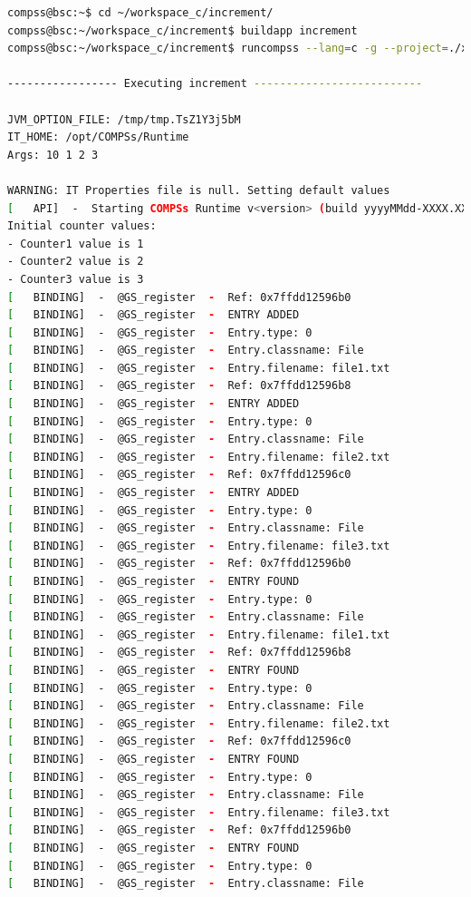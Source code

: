 \begin{lstlisting}[language=bash]
compss@bsc:~$ cd ~/workspace_c/increment/
compss@bsc:~/workspace_c/increment$ buildapp increment
compss@bsc:~/workspace_c/increment$ runcompss --lang=c -g --project=./xml/project.xml --resources=./xml/resources.xml ~/workspace_c/increment/master/increment 10 1 2 3

----------------- Executing increment --------------------------

JVM_OPTION_FILE: /tmp/tmp.TsZ1Y3j5bM 
IT_HOME: /opt/COMPSs/Runtime 
Args: 10 1 2 3 

WARNING: IT Properties file is null. Setting default values
[   API]  -  Starting COMPSs Runtime v<version> (build yyyyMMdd-XXXX.XXXX)
Initial counter values: 
- Counter1 value is 1
- Counter2 value is 2
- Counter3 value is 3
[   BINDING]  -  @GS_register  -  Ref: 0x7ffdd12596b0
[   BINDING]  -  @GS_register  -  ENTRY ADDED
[   BINDING]  -  @GS_register  -  Entry.type: 0
[   BINDING]  -  @GS_register  -  Entry.classname: File
[   BINDING]  -  @GS_register  -  Entry.filename: file1.txt
[   BINDING]  -  @GS_register  -  Ref: 0x7ffdd12596b8
[   BINDING]  -  @GS_register  -  ENTRY ADDED
[   BINDING]  -  @GS_register  -  Entry.type: 0
[   BINDING]  -  @GS_register  -  Entry.classname: File
[   BINDING]  -  @GS_register  -  Entry.filename: file2.txt
[   BINDING]  -  @GS_register  -  Ref: 0x7ffdd12596c0
[   BINDING]  -  @GS_register  -  ENTRY ADDED
[   BINDING]  -  @GS_register  -  Entry.type: 0
[   BINDING]  -  @GS_register  -  Entry.classname: File
[   BINDING]  -  @GS_register  -  Entry.filename: file3.txt
[   BINDING]  -  @GS_register  -  Ref: 0x7ffdd12596b0
[   BINDING]  -  @GS_register  -  ENTRY FOUND
[   BINDING]  -  @GS_register  -  Entry.type: 0
[   BINDING]  -  @GS_register  -  Entry.classname: File
[   BINDING]  -  @GS_register  -  Entry.filename: file1.txt
[   BINDING]  -  @GS_register  -  Ref: 0x7ffdd12596b8
[   BINDING]  -  @GS_register  -  ENTRY FOUND
[   BINDING]  -  @GS_register  -  Entry.type: 0
[   BINDING]  -  @GS_register  -  Entry.classname: File
[   BINDING]  -  @GS_register  -  Entry.filename: file2.txt
[   BINDING]  -  @GS_register  -  Ref: 0x7ffdd12596c0
[   BINDING]  -  @GS_register  -  ENTRY FOUND
[   BINDING]  -  @GS_register  -  Entry.type: 0
[   BINDING]  -  @GS_register  -  Entry.classname: File
[   BINDING]  -  @GS_register  -  Entry.filename: file3.txt
[   BINDING]  -  @GS_register  -  Ref: 0x7ffdd12596b0
[   BINDING]  -  @GS_register  -  ENTRY FOUND
[   BINDING]  -  @GS_register  -  Entry.type: 0
[   BINDING]  -  @GS_register  -  Entry.classname: File

\end{lstlisting}
